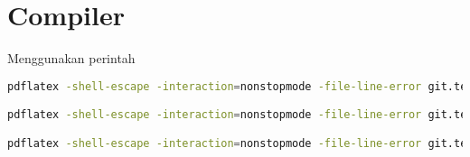 \section{Compiler}
Menggunakan perintah
\begin{lstlisting}[caption=Perintah kompilasi latex keluaran pdf,label={lst:compile},language=sh]
pdflatex -shell-escape -interaction=nonstopmode -file-line-error git.tex | grep ".*:[0-9]*:.*|LaTeX Warning:"

pdflatex -shell-escape -interaction=nonstopmode -file-line-error git.tex | grep ".*:[0-9]*:.*"

pdflatex -shell-escape -interaction=nonstopmode -file-line-error git.tex | grep -i ".*:[0-9]*:.*\|warning"
\end{lstlisting}